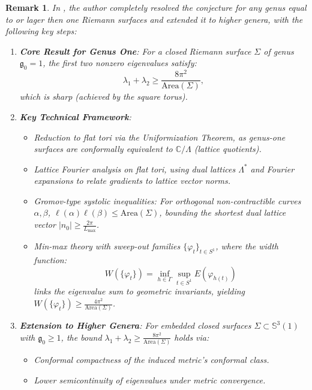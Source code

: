 \documentclass[a4, 12pt]{amsart}
\numberwithin{equation}{section} \numberwithin{equation}{section}
\newtheorem{rem}{Remark}[section]{\bfseries\upshape}
\begin{document}
\begin{rem}
In \cite{Zeng1}, the author completely resolved the conjecture for any genus equal to or lager then one Riemann surfaces and extended it to higher genera, with the following key steps:

\begin{enumerate}
    \item \textbf{Core Result for Genus One}: For a closed Riemann surface $\Sigma$ of genus $\mathfrak{g}_0 = 1$, the first two nonzero eigenvalues satisfy:
    \begin{equation*}
    \lambda_1 + \lambda_2 \geq \frac{8\pi^2}{\text{Area}(\Sigma)},
    \end{equation*}
    which is sharp (achieved by the square torus).

    \item \textbf{Key Technical Framework}:
    \begin{itemize}
        \item[(i)] Reduction to flat tori via the Uniformization Theorem, as genus-one surfaces are conformally equivalent to $\mathbb{C}/\Lambda$ (lattice quotients).
        \item[(ii)] Lattice Fourier analysis on flat tori, using dual lattices $\Lambda^*$ and Fourier expansions to relate gradients to lattice vector norms.
        \item[(iii)] Gromov-type systolic inequalities: For orthogonal non-contractible curves $\alpha, \beta$, $\ell(\alpha)\ell(\beta) \leq \text{Area}(\Sigma)$, bounding the shortest dual lattice vector $|n_0| \geq \frac{2\pi}{L_{\text{max}}}$.
        \item[(iv)] Min-max theory with sweep-out families $\{\varphi_t\}_{t \in S^1}$, where the width function:
        \begin{equation*}
        W(\{\varphi_t\}) = \inf_{h \in \Gamma}\sup_{t \in S^1} E(\varphi_{h(t)})
        \end{equation*}
        links the eigenvalue sum to geometric invariants, yielding $W(\{\varphi_t\}) \geq \frac{4\pi^2}{\text{Area}(\Sigma)}$.
    \end{itemize}

    \item \textbf{Extension to Higher Genera}: For embedded closed surfaces $\Sigma \subset \mathbb{S}^3(1)$ with $\mathfrak{g}_0 \geq 1$, the bound $\lambda_1 + \lambda_2 \geq \frac{8\pi^2}{\text{Area}(\Sigma)}$ holds via:
    \begin{itemize}
        \item[(i)] Conformal compactness of the induced metric's conformal class.
        \item[(ii)] Lower semicontinuity of eigenvalues under metric convergence.
    \end{itemize}


\end{enumerate}
\end{rem}
\end{document}
